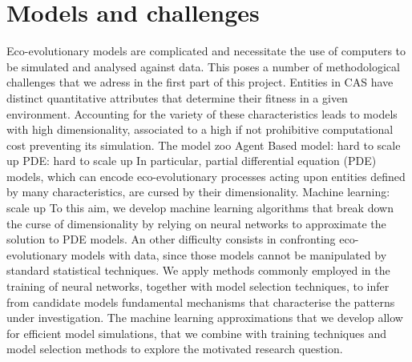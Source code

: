 \section{Models and challenges}
\begin{outline}
    \1 Eco-evolutionary models are complicated and necessitate the use of computers to be simulated and analysed against data. This poses a number of methodological challenges that we adress in the first part of this project.
        \2 Entities in CAS have distinct quantitative attributes that determine their fitness in a given environment. Accounting for the variety of these characteristics leads to models with high dimensionality, associated to a high if not prohibitive computational cost preventing its simulation.
            \3 The model zoo
                \4 Agent Based model: hard to scale up
                \4 PDE: hard to scale up
                \4 In particular, partial differential equation (PDE) models, which can encode eco-evolutionary processes acting upon entities defined by many characteristics, are cursed by their dimensionality.
                \4 Machine learning: scale up
            \3 To this aim, we develop machine learning algorithms that break down the curse of dimensionality by relying on neural networks to approximate the solution to PDE models.
        \2 An other difficulty consists in confronting eco-evolutionary models with data, since those models cannot be manipulated by standard statistical techniques. 
            \3 We apply methods commonly employed in the training of neural networks, together with model selection techniques, to infer from candidate models fundamental mechanisms that characterise the patterns under investigation.
    \1 The machine learning approximations that we develop allow for efficient model simulations, that we combine with training techniques and model selection methods to explore the motivated research question.
\end{outline}


